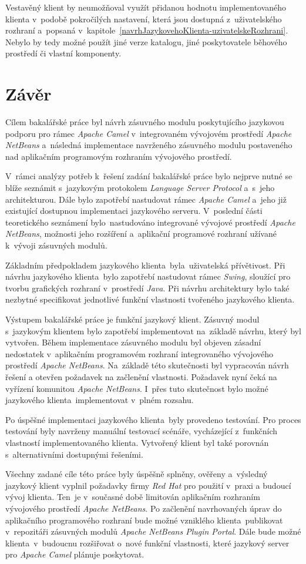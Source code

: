 Vestavěný klient by neumožňoval využít přidanou hodnotu implementovaného klienta v~podobě pokročilých nastavení, která jsou dostupná z~uživatelského rozhraní a~popsaná v~kapitole~\ref{navrhJazykovehoKlienta-uzivatelskeRozhrani}. Nebylo by tedy možné použít jiné verze katalogu, jiné poskytovatele běhového prostředí či vlastní komponenty.

\chapter{Závěr}
\label{zaver}
Cílem bakalářské práce byl návrh zásuvného modulu poskytujícího jazykovou podporu pro rámec \emph{Apache Camel} v~integrovaném vývojovém prostředí \emph{Apache NetBeans} a~následná implementace navrženého zásuvného modulu postaveného nad aplikačním programovým rozhraním vývojového prostředí. 

V~rámci analýzy potřeb k~řešení zadání bakalářské práce bylo nejprve nutné se blíže seznámit s~jazykovým protokolem \emph{Language Server Protocol} a~s~jeho architekturou. Dále bylo zapotřebí nastudovat rámec \emph{Apache Camel} a~jeho již existující dostupnou implementaci jazykového serveru. V~poslední části teoretického seznámení bylo~nastudováno integrované vývojové prostředí \emph{Apache NetBeans}, možnosti jeho rozšíření a~aplikační programové rozhraní užívané k~vývoji zásuvných modulů. 

Základním předpokladem jazykového klienta~byla~uživatelská přívětivost. Při návrhu jazykového klienta~bylo zapotřebí nastudovat rámec \emph{Swing}, sloužící pro tvorbu grafických rozhraní v~prostředí \emph{Java}. Při návrhu architektury bylo také nezbytné specifikovat jednotlivé funkční vlastnosti tvořeného jazykového klienta.

Výstupem bakalářské práce je funkční jazykový klient. Zásuvný modul s~jazykovým klientem bylo zapotřebí implementovat na~základě návrhu, který byl vytvořen. Během implementace zásuvného modulu byl objeven zásadní nedostatek v~aplikačním programovém rozhraní integrovaného vývojového prostředí \emph{Apache NetBeans}. Na~základě této skutečnosti byl vypracován návrh řešení a otevřen požadavek na začlenění vlastnosti. Požadavek nyní čeká na vyřízení komunitou \emph{Apache NetBeans}. I~přes tuto skutečnost bylo možné jazykového klienta~implementovat v~plném rozsahu.

Po úspěšné implementaci jazykového klienta~byly provedeno testování. Pro proces testování byly navrženy manuální testovací scénáře, vycházející z~funkčních vlastností implementovaného klienta. Vytvořený klient byl také porovnán s~alternativními dostupnými řešeními. 

Všechny zadané cíle této práce byly úspěšně splněny, ověřeny a~výsledný jazykový klient vyplnil požadavky firmy \emph{Red Hat} pro použití v~praxi a budoucí vývoj klienta. Ten~je v~současné době limitován aplikačním rozhraním vývojového prostředí \emph{Apache NetBeans}. Po začlenění navrhovaných úprav do aplikačního programového rozhraní bude možné vzniklého klienta~publikovat v~repozitáři zásuvných modulů \emph{Apache NetBeans Plugin Portal}. Dále bude možné klienta~v~budoucnu rozšiřovat o~nové funkční vlastnosti, které jazykový server pro \emph{Apache Camel} plánuje poskytovat.